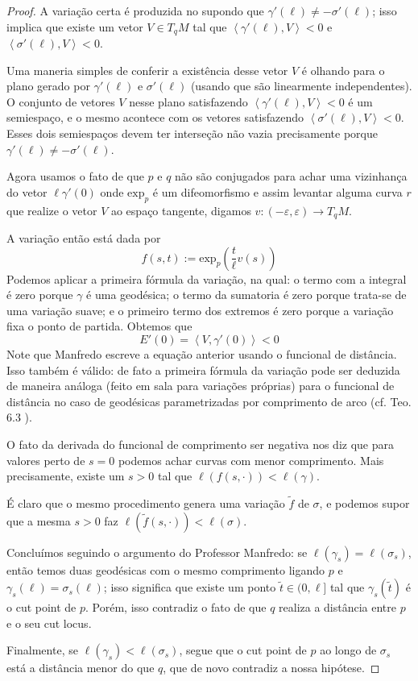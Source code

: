 \begin{proof}
\bigskip

A variação certa é produzida no \cite{doc} supondo que 
$\gamma'(\ell)\neq -\sigma'(\ell)$; isso implica que existe um vetor
 $V \in T_q M$ tal que 
$\left<\gamma'(\ell),V\right>< 0$ e $\left<\sigma'(\ell),V\right>< 0$.

Uma maneria simples de conferir a existência desse vetor $V$ é olhando para o 
plano gerado por $\gamma'(\ell)$ e $\sigma'(\ell)$ (usando que são linearmente
independentes). O conjunto de vetores $V$ nesse plano satisfazendo 
$\left<\gamma'(\ell),V\right><0$ é um semiespaço, e o mesmo acontece com 
 os vetores satisfazendo $\left<\sigma'(\ell),V\right><0$. Esses dois semiespaços
devem ter interseção não vazia precisamente porque 
$\gamma'(\ell)\neq -\sigma'(\ell)$.

Agora usamos o fato de que $p$ e $q$ não são conjugados para 
achar uma vizinhança do vetor $\ell \gamma'(0)$ onde $\text{exp}_p$ é um
difeomorfismo e assim levantar alguma
curva $r$ que realize o vetor $V$ ao espaço tangente,
 digamos $v:(-\varepsilon,\varepsilon) \to T_q M$.

A variação então está dada por
$$
f(s,t):=\text{exp}_p\left(\frac{t}{\ell}v(s)\right)
$$
Podemos aplicar a primeira fórmula da variação, na qual: o termo com a
integral é zero porque $\gamma$ é uma geodésica; o termo da sumatoria é zero
porque trata-se de uma variação suave; e o primeiro termo dos extremos é zero
porque a variação fixa o ponto de partida. Obtemos que 
$$
E'(0)=\left<V,\gamma'(0)\right><0
$$
Note que Manfredo escreve a equação anterior usando o funcional de distância. 
Isso também é válido: de fato a primeira fórmula da variação pode ser 
deduzida de maneira análoga (feito em sala para variações próprias) 
 para o funcional de distância no caso de geodésicas parametrizadas por 
comprimento de arco (cf. Teo. 6.3 \cite{ler}).

O fato da derivada do funcional de comprimento ser negativa nos diz que para
valores perto de $s=0$ podemos achar curvas com menor comprimento. Mais
precisamente, existe um $s>0$ tal que $\ell(f(s,\cdot))<\ell(\gamma)$.

É claro que o mesmo procedimento genera uma variação $\tilde{f}$ de $\sigma$, e 
podemos supor que a mesma $s>0$ faz $\ell(\tilde{f}(s,\cdot))<\ell(\sigma)$.

Concluímos seguindo o argumento do Professor Manfredo: se 
$\ell(\gamma_s)=\ell(\sigma_s)$, então temos duas geodésicas com o mesmo
comprimento ligando $p$ e $\gamma_s(\ell)=\sigma_s(\ell)$; isso significa 
que existe um ponto $\tilde{t} \in (0,\ell]$ tal que $\gamma_s(\tilde{t})$ é
 o cut point de $p$. Porém, isso contradiz o fato de que $q$ realiza a 
distância entre $p$ e o seu cut locus.

Finalmente, se $\ell(\gamma_s)<\ell(\sigma_s)$, segue que o cut point de $p$
 ao longo de $\sigma_s$ está a distância menor do que $q$, que de novo contradiz
a nossa hipótese.
\end{proof}

